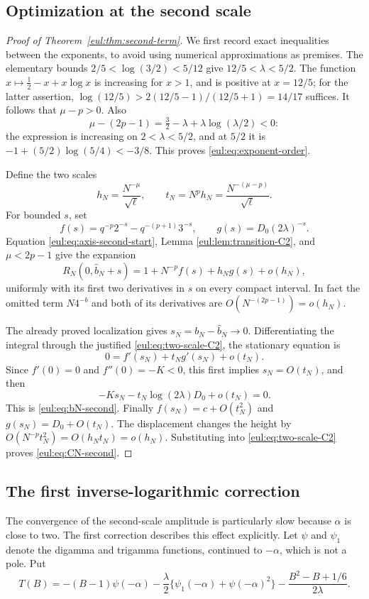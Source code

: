 \documentclass[11pt]{article}
\numberwithin{equation}{section}
\theoremstyle{definition}
\theoremstyle{remark}
\begin{document}
\subsection{Optimization at the second scale}
\begin{proof}[Proof of Theorem~\ref{eul:thm:second-term}]
We first record exact inequalities between the exponents, to avoid
using numerical approximations as premises.  The elementary bounds
$2/5<\log(3/2)<5/12$ give $12/5<\lambda<5/2$.
The function
$x\mapsto\tfrac12-x+x\log x$ is increasing for $x>1$, and is
positive at $x=12/5$; for the latter assertion,
$\log(12/5)>2(12/5-1)/(12/5+1)=14/17$ suffices.
It follows that $\mu-p>0$.
Also
\[
 \mu-(2p-1)=\tfrac32-\lambda+\lambda\log(\lambda/2)<0:
\]
the expression is increasing on $2<\lambda<5/2$, and at $5/2$ it
is $-1+(5/2)\log(5/4)<-3/8$.
This proves \eqref{eul:eq:exponent-order}.

Define the two scales
\[
 h_N=\frac{N^{-\mu}}{\sqrt\ell},\qquad
 t_N=N^ph_N=\frac{N^{-(\mu-p)}}{\sqrt\ell}.
\]
For bounded $s$, set
\[
 f(s)=q^{-p}2^{-s}-q^{-(p+1)}3^{-s},\qquad
 g(s)=D_0(2\lambda)^{-s}.
\]
Equation \eqref{eul:eq:axis-second-start}, Lemma
\ref{eul:lem:transition-C2}, and $\mu<2p-1$ give the expansion
\begin{equation}\label{eul:eq:two-scale-C2}
 R_N(0,\widehat b_N+s)
   =1+N^{-p}f(s)+h_Ng(s)+o(h_N),
\end{equation}
uniformly with its first two derivatives in $s$ on every compact
interval.  In fact the omitted term $N4^{-b}$ and both of its
derivatives are $O(N^{-(2p-1)})=o(h_N)$.

The already proved localization gives $s_N=b_N-\widehat b_N\to0$.
Differentiating the integral through the justified
\eqref{eul:eq:two-scale-C2}, the stationary equation is
\[
 0=f'(s_N)+t_Ng'(s_N)+o(t_N).
\]
Since $f'(0)=0$ and $f''(0)=-K<0$, this first implies
$s_N=O(t_N)$, and then
\[
 -Ks_N-t_N\log(2\lambda)D_0+o(t_N)=0.
\]
This is \eqref{eul:eq:bN-second}.
Finally $f(s_N)=c+O(t_N^2)$ and $g(s_N)=D_0+O(t_N)$.
The displacement changes the height by
$O(N^{-p}t_N^2)=O(h_Nt_N)=o(h_N)$.
Substituting into \eqref{eul:eq:two-scale-C2} proves
\eqref{eul:eq:CN-second}.
\end{proof}

\subsection{The first inverse-logarithmic correction}
The convergence of the second-scale amplitude is particularly slow
because $\alpha$ is close to two.  The first correction describes
this effect explicitly.  Let $\psi$ and $\psi_1$ denote the digamma
and trigamma functions, continued to $-\alpha$, which is not a pole.
Put
\begin{equation}\label{eul:eq:T-B}
 T(B)=-(B-1)\psi(-\alpha)
 -\frac\lambda2\{\psi_1(-\alpha)+\psi(-\alpha)^2\}
 -\frac{B^2-B+1/6}{2\lambda}.
\end{equation}
\end{document}
